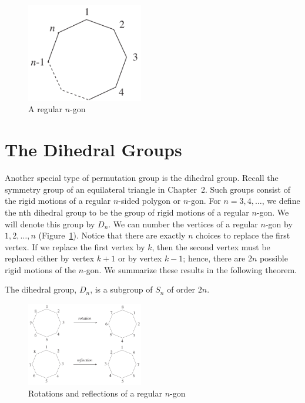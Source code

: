 \vspace{2ex} 
 
\begin{figure}[hbt]
\begin{center}
\centerline {
\includegraphics[width=2in]{regular}
}
\end{center}
\caption{A regular $n$-gon}
\label{regular}
\end{figure}
 
 
 
 
\section{The Dihedral Groups}
 
 
Another special type of permutation group is the dihedral group. 
Recall the symmetry group of an equilateral triangle in Chapter~2. 
Such groups consist of the  rigid motions of a regular $n$-sided 
polygon or $n$-gon. For $n = 3, 4, \ldots$, we define the {\bfi 
nth dihedral group\/} to be the group of 
rigid motions of a regular $n$-gon.  We will denote this group by
$D_n$\label{dihedralgroup}.  We can number the vertices of a regular
$n$-gon by $1, 2, \ldots, n$ (Figure~\ref{regular}).  Notice that
there are exactly $n$ choices to replace the first vertex.  If we
replace the first vertex by $k$, then the second vertex must be replaced
either by vertex $k+1$ or by vertex $k-1$; hence, there are $2n$
possible rigid motions of the $n$-gon.  We summarize these results in
the following theorem.  
 
 
 
 
\begin{theorem}
The dihedral group, $D_n$, is a subgroup of $S_n$ of order $2n$.
\end{theorem}
 
 
\begin{figure}[htb]
\begin{center}
\centerline {
\includegraphics[width=2in]{rotations}
}
\end{center}
\caption{Rotations and reflections of a regular $n$-gon}
\label{rotations}
\end{figure}
 
